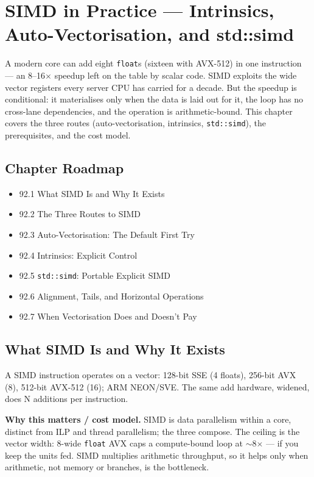 \chapter{SIMD in Practice --- Intrinsics, Auto-Vectorisation, and std::simd}

A modern core can add eight \texttt{float}s (sixteen with AVX-512) in one instruction --- an 8--16$\times$ speedup left on the table by scalar code. SIMD exploits the wide vector registers every server CPU has carried for a decade. But the speedup is conditional: it materialises only when the data is laid out for it, the loop has no cross-lane dependencies, and the operation is arithmetic-bound. This chapter covers the three routes (auto-vectorisation, intrinsics, \texttt{std::simd}), the prerequisites, and the cost model.

\section*{Chapter Roadmap}
\begin{itemize}
\item 92.1 What SIMD Is and Why It Exists
\item 92.2 The Three Routes to SIMD
\item 92.3 Auto-Vectorisation: The Default First Try
\item 92.4 Intrinsics: Explicit Control
\item 92.5 \texttt{std::simd}: Portable Explicit SIMD
\item 92.6 Alignment, Tails, and Horizontal Operations
\item 92.7 When Vectorisation Does and Doesn't Pay
\end{itemize}

\section{What SIMD Is and Why It Exists}
A SIMD instruction operates on a vector: 128-bit SSE (4 floats), 256-bit AVX (8), 512-bit AVX-512 (16); ARM NEON/SVE. The same add hardware, widened, does N additions per instruction.

\textbf{Why this matters / cost model.} SIMD is data parallelism within a core, distinct from ILP and thread parallelism; the three compose. The ceiling is the vector width: 8-wide \texttt{float} AVX caps a compute-bound loop at $\sim$8$\times$ --- if you keep the units fed. SIMD multiplies arithmetic throughput, so it helps only when arithmetic, not memory or branches, is the bottleneck.

